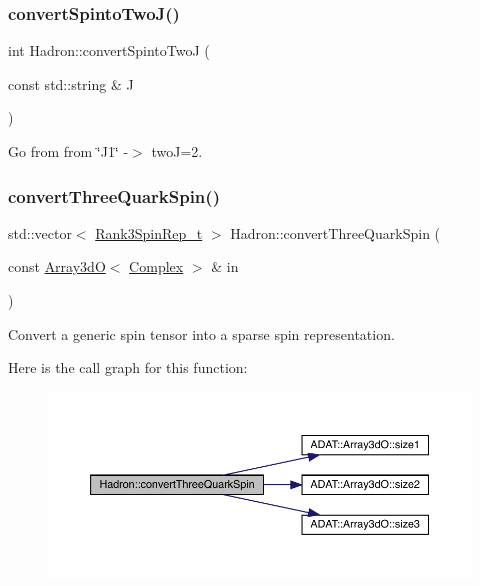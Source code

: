 \subsubsection{\texorpdfstring{convertSpintoTwoJ()}{convertSpintoTwoJ()}}
{\footnotesize\ttfamily int Hadron\+::convert\+Spinto\+TwoJ (\begin{DoxyParamCaption}\item[{const std\+::string \&}]{J }\end{DoxyParamCaption})}



Go from from \char`\"{}\+J1\char`\"{} -\/$>$ twoJ=2. 

\mbox{\label{namespaceHadron_abbb775633773ccb52dcaef4974305df9}} 
\subsubsection{\texorpdfstring{convertThreeQuarkSpin()}{convertThreeQuarkSpin()}}
{\footnotesize\ttfamily std\+::vector$<$ \mbox{\hyperlink{structHadron_1_1Rank3SpinRep__t}{Rank3\+Spin\+Rep\+\_\+t}} $>$ Hadron\+::convert\+Three\+Quark\+Spin (\begin{DoxyParamCaption}\item[{const \mbox{\hyperlink{classADAT_1_1Array3dO}{Array3dO}}$<$ \mbox{\hyperlink{group__defs_gabaa4aa11d5212d34042d08bf0b2f9cc0}{Complex}} $>$ \&}]{in }\end{DoxyParamCaption})}



Convert a generic spin tensor into a sparse spin representation. 

Here is the call graph for this function\+:\nopagebreak
\begin{figure}[H]
\begin{center}
\leavevmode
\includegraphics[width=350pt]{d1/daf/namespaceHadron_abbb775633773ccb52dcaef4974305df9_cgraph}
\end{center}
\end{figure}
\mbox{\label{namespaceHadron_a354d39c9f601a0a0f19857eb4b79a2d2}} 
